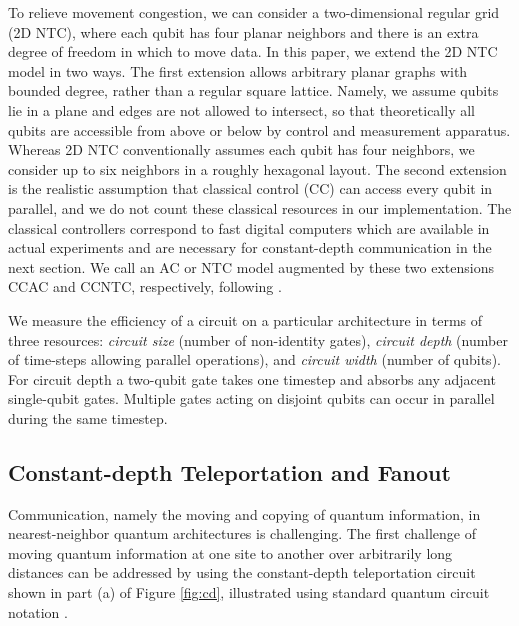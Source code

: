 \documentclass[twoside]{article}
\begin{document}
To relieve movement congestion,
we can consider a two-dimensional regular grid
(2D NTC), where each
qubit has four planar neighbors and 
there is an extra degree of freedom
in which to move data.
In this paper, we extend the \textsc{2D NTC} model in two ways.
The first extension allows arbitrary planar graphs
with bounded degree, rather than a regular square lattice.
Namely, we assume qubits lie in a plane and edges are not allowed to intersect,
so that theoretically all qubits are accessible from above
or below by control and measurement apparatus.
Whereas 2D NTC conventionally assumes each qubit
has four neighbors, we consider up to six neighbors in a roughly hexagonal
layout. The second extension is the realistic assumption
that classical control (CC) can
access every qubit in parallel, and we do not count these classical
resources in our implementation. The classical controllers
correspond to fast digital computers which are
available in actual experiments and are necessary for constant-depth
communication in the next section.
We call an AC or NTC model augmented by these two extensions
\textsc{CCAC} and \textsc{CCNTC}, respectively, following
\cite{Rosenbaum2012}.

We measure the efficiency of a circuit on a particular
architecture in terms of three resources:
\emph{circuit size} (number of non-identity gates),
\emph{circuit depth} (number of time-steps allowing parallel operations),
and \emph{circuit width} (number of qubits).
For circuit depth a two-qubit gate takes
one timestep and absorbs any adjacent single-qubit gates.
Multiple gates acting on disjoint qubits
can occur in parallel during the same timestep.

\subsection{Constant-depth Teleportation and Fanout}
\label{subsec:fanout}

Communication, namely the moving and copying of quantum information, in nearest-neighbor quantum architectures is challenging.
The first challenge of moving quantum information at one site to another over
arbitrarily long distances can be addressed by using
the constant-depth teleportation circuit
shown in part (a) of Figure \ref{fig:cd}, illustrated using standard quantum circuit
notation \cite{Nielsen2000}.
\end{document}
